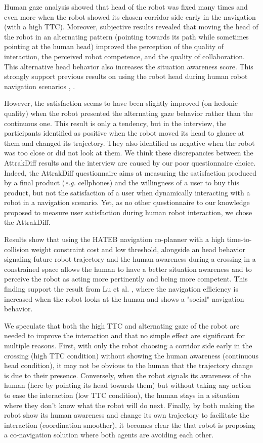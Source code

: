 \documentclass[a4paper,11pt,twoside]{StyleThese}
\begin{document}
Human gaze analysis showed that head of the robot was fixed many times and even more when the robot showed its chosen corridor side early in the navigation (with a high TTC). Moreover, subjective results revealed that moving the head of the robot in an alternating pattern (pointing towards its path while sometimes pointing at the human head) improved the perception of the quality of interaction, the perceived robot competence, and the quality of collaboration. This alternative head behavior also increases the situation awareness score. This strongly support previous results on using the robot head during human robot navigation scenarios \cite{khambhaita_head-body_2016}, \cite{may_show_2015}.

However, the satisfaction seems to have been slightly improved (on hedonic quality) when the robot presented the alternating gaze behavior rather than the continuous one. This result is only a tendency, but in the interview, the participants identified as positive when the robot moved its head to glance at them and changed its trajectory. They also identified as negative when the robot was too close or did not look at them. We think these discrepancies between the AttrakDiff results and the interview are caused by our poor questionnaire choice. Indeed, the AttrakDiff questionnaire aims at measuring the satisfaction produced by a final product (\textit{e.g.} cellphones) and the willingness of a user to buy this product, but not the satisfaction of a user when dynamically interacting with a robot in a navigation scenario. Yet, as no other questionnaire to our knowledge proposed to measure user satisfaction during human robot interaction, we chose the AttrakDiff.

Results show that using the HATEB navigation co-planner with a high time-to-collision weight constraint cost and low threshold, alongside an head behavior signaling future robot trajectory and the human awareness during a crossing in a constrained space allows the human to have a better situation awareness and to perceive the robot as acting more pertinently and being more competent. This finding support the result from Lu et al. \cite{lu_towards_2013}, where the navigation efficiency is increased when the robot looks at the human and shows a "social" navigation behavior.

We speculate that both the high TTC and alternating gaze of the robot are needed to improve the interaction and that no simple effect are significant for multiple reasons. First, with only the robot choosing a corridor side early in the crossing (high TTC condition) without showing the human awareness (continuous head condition), it may not be obvious to the human that the trajectory change is due to their presence. Conversely, when the robot signals its awareness of the human (here by pointing its head towards them) but without taking any action to ease the interaction (low TTC condition), the human stays in a situation where they don't know what the robot will do next. Finally, by both making the robot show its human awareness and change its own trajectory to facilitate the interaction (coordination smoother), it becomes clear the that robot is proposing a co-navigation solution where both agents are avoiding each other.
\end{document}
